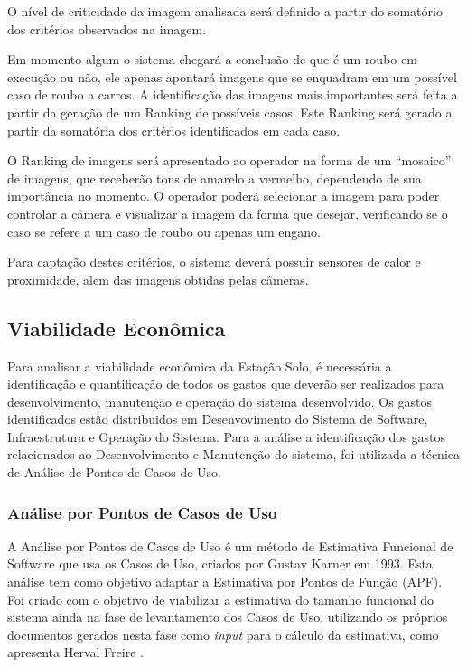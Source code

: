 	O nível de criticidade da imagem analisada será definido a partir do somatório dos critérios observados na imagem.

	Em momento algum o sistema chegará a conclusão de que é um roubo em execução ou não, ele apenas apontará imagens que se enquadram em um possível caso de roubo a carros. A identificação das imagens mais importantes será feita a partir da geração de um Ranking de possíveis casos. Este Ranking será gerado a partir da somatória dos critérios identificados em cada caso.

	O Ranking de imagens será apresentado ao operador na forma de um “mosaico” de imagens, que receberão tons de amarelo a vermelho, dependendo de sua importância no momento. O operador poderá selecionar a imagem para poder controlar a câmera e visualizar a imagem da forma que desejar, verificando se o caso se refere a um caso de roubo ou apenas um engano.

	Para captação destes critérios, o sistema deverá possuir sensores de calor e proximidade, alem das imagens obtidas pelas câmeras.


	\subsection{Viabilidade Econômica}

	Para analisar a viabilidade econômica da Estação Solo, é necessária a identificação e quantificação de todos os gastos que deverão ser realizados para desenvolvimento, manutenção e operação do sistema desenvolvido. Os gastos identificados estão distribuidos em Desenvovimento do Sistema de Software, Infraestrutura e Operação do Sistema. Para a análise a identificação dos gastos relacionados ao Desenvolvimento e Manutenção do sistema, foi utilizada a técnica de Análise de Pontos de Casos de Uso.


	\subsubsection{Análise por Pontos de Casos de Uso}

			A Análise por Pontos de Casos de Uso é um método de Estimativa Funcional de Software que usa os Casos de Uso, criados por Gustav Karner \cite{karner1993resource} em 1993. Esta análise tem como objetivo adaptar a Estimativa por Pontos de Função (APF). Foi criado com o objetivo de viabilizar a estimativa do tamanho funcional do sistema ainda na fase de levantamento dos Casos de Uso, utilizando os próprios documentos gerados nesta fase como \textit{input} para o cálculo da estimativa, como apresenta Herval Freire \cite{freire2003calculando}.

